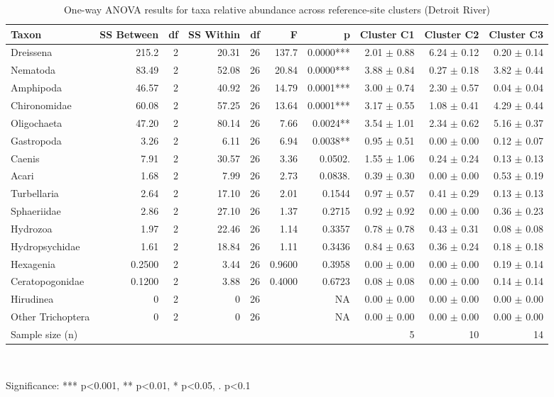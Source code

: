 \begin{table}[htbp]
  \centering
  \caption{One-way ANOVA results for taxa relative abundance across reference-site clusters (Detroit River)}
  \label{tab:dr_02_taxa_assemblage_anova_taxa}
  \small
  \begin{tabular}{lrrrrrrrrr}
    \toprule
    Taxon & SS Between & df & SS Within & df  & F & p & Cluster C1 & Cluster C2 & Cluster C3 \\
    \midrule
    Dreissena & 215.2 & 2 & 20.31 & 26 & 137.7 & 0.0000*** & 2.01 $\pm$ 0.88 & 6.24 $\pm$ 0.12 & 0.20 $\pm$ 0.14 \\
    Nematoda & 83.49 & 2 & 52.08 & 26 & 20.84 & 0.0000*** & 3.88 $\pm$ 0.84 & 0.27 $\pm$ 0.18 & 3.82 $\pm$ 0.44 \\
    Amphipoda & 46.57 & 2 & 40.92 & 26 & 14.79 & 0.0001*** & 3.00 $\pm$ 0.74 & 2.30 $\pm$ 0.57 & 0.04 $\pm$ 0.04 \\
    Chironomidae & 60.08 & 2 & 57.25 & 26 & 13.64 & 0.0001*** & 3.17 $\pm$ 0.55 & 1.08 $\pm$ 0.41 & 4.29 $\pm$ 0.44 \\
    Oligochaeta & 47.20 & 2 & 80.14 & 26 & 7.66 & 0.0024** & 3.54 $\pm$ 1.01 & 2.34 $\pm$ 0.62 & 5.16 $\pm$ 0.37 \\
    Gastropoda & 3.26 & 2 & 6.11 & 26 & 6.94 & 0.0038** & 0.95 $\pm$ 0.51 & 0.00 $\pm$ 0.00 & 0.12 $\pm$ 0.07 \\
    Caenis & 7.91 & 2 & 30.57 & 26 & 3.36 & 0.0502. & 1.55 $\pm$ 1.06 & 0.24 $\pm$ 0.24 & 0.13 $\pm$ 0.13 \\
    Acari & 1.68 & 2 & 7.99 & 26 & 2.73 & 0.0838. & 0.39 $\pm$ 0.30 & 0.00 $\pm$ 0.00 & 0.53 $\pm$ 0.19 \\
    Turbellaria & 2.64 & 2 & 17.10 & 26 & 2.01 & 0.1544 & 0.97 $\pm$ 0.57 & 0.41 $\pm$ 0.29 & 0.13 $\pm$ 0.13 \\
    Sphaeriidae & 2.86 & 2 & 27.10 & 26 & 1.37 & 0.2715 & 0.92 $\pm$ 0.92 & 0.00 $\pm$ 0.00 & 0.36 $\pm$ 0.23 \\
    Hydrozoa & 1.97 & 2 & 22.46 & 26 & 1.14 & 0.3357 & 0.78 $\pm$ 0.78 & 0.43 $\pm$ 0.31 & 0.08 $\pm$ 0.08 \\
    Hydropsychidae & 1.61 & 2 & 18.84 & 26 & 1.11 & 0.3436 & 0.84 $\pm$ 0.63 & 0.36 $\pm$ 0.24 & 0.18 $\pm$ 0.18 \\
    Hexagenia & 0.2500 & 2 & 3.44 & 26 & 0.9600 & 0.3958 & 0.00 $\pm$ 0.00 & 0.00 $\pm$ 0.00 & 0.19 $\pm$ 0.14 \\
    Ceratopogonidae & 0.1200 & 2 & 3.88 & 26 & 0.4000 & 0.6723 & 0.08 $\pm$ 0.08 & 0.00 $\pm$ 0.00 & 0.14 $\pm$ 0.14 \\
    Hirudinea & 0 & 2 & 0 & 26 &  & NA & 0.00 $\pm$ 0.00 & 0.00 $\pm$ 0.00 & 0.00 $\pm$ 0.00 \\
    Other Trichoptera & 0 & 2 & 0 & 26 &  & NA & 0.00 $\pm$ 0.00 & 0.00 $\pm$ 0.00 & 0.00 $\pm$ 0.00 \\
    Sample size (n) &  &  &  &  &  &  & 5 & 10 & 14 \\
    \bottomrule
  \end{tabular}
  \\[4pt]
  \parbox{\textwidth}{\footnotesize Significance: *** p<0.001, ** p<0.01, * p<0.05, . p<0.1}
\end{table}
